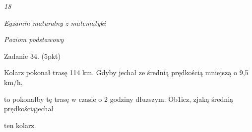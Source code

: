 \documentclass[a4paper,12pt]{article}
\begin{document}
{\it 18}

{\it Egzamin maturalny z matematyki}

{\it Poziom podstawowy}

Zadanie 34. (5pkt)

Kolarz pokonał trasę 114 km. Gdyby jechał ze średnią prędkością mniejszą o 9,5 km/h,

to pokonałby tę trasę w czasie o 2 godziny dłuzszym. Ob1icz, zjaką średnią prędkościąjechał

ten kolarz.
\end{document}
